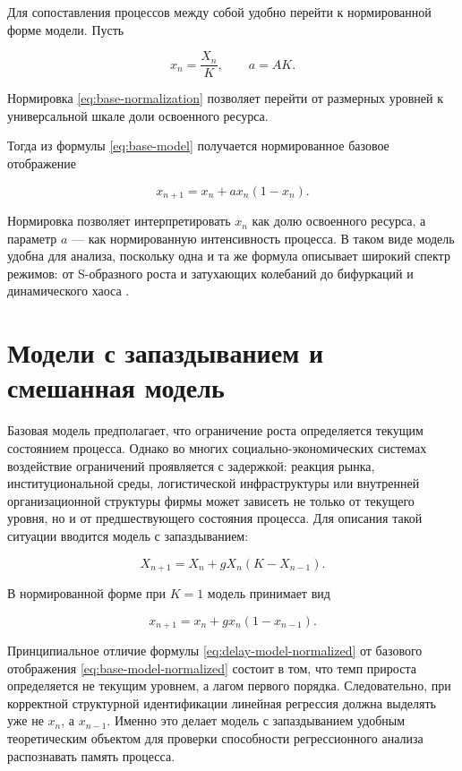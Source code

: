 Для сопоставления процессов между собой удобно перейти к нормированной форме модели. Пусть

\begin{equation}
x_n=\frac{X_n}{K}, \qquad a=AK.
\label{eq:base-normalization}
\end{equation}

Нормировка \eqref{eq:base-normalization} позволяет перейти от размерных уровней к универсальной шкале доли освоенного ресурса.

Тогда из формулы \eqref{eq:base-model} получается нормированное базовое отображение

\begin{equation}
x_{n+1}=x_n + a x_n(1-x_n).
\label{eq:base-model-normalized}
\end{equation}

Нормировка позволяет интерпретировать \(x_n\) как долю освоенного ресурса, а параметр \(a\) --- как нормированную интенсивность процесса. В таком виде модель удобна для анализа, поскольку одна и та же формула описывает широкий спектр режимов: от S-образного роста и затухающих колебаний до бифуркаций и динамического хаоса \cite{malinetsky,strogatz,feigenbaum-ufn}.

\section{Модели с запаздыванием и смешанная модель}
\label{sec:delay-and-mixed-models}

Базовая модель предполагает, что ограничение роста определяется текущим состоянием процесса. Однако во многих социально-экономических системах воздействие ограничений проявляется с задержкой: реакция рынка, институциональной среды, логистической инфраструктуры или внутренней организационной структуры фирмы может зависеть не только от текущего уровня, но и от предшествующего состояния процесса. Для описания такой ситуации вводится модель с запаздыванием:

\begin{equation}
X_{n+1}=X_n + g X_n (K-X_{n-1}).
\label{eq:delay-model}
\end{equation}

В нормированной форме при \(K=1\) модель принимает вид

\begin{equation}
x_{n+1}=x_n + g x_n (1-x_{n-1}).
\label{eq:delay-model-normalized}
\end{equation}

Принципиальное отличие формулы \eqref{eq:delay-model-normalized} от базового отображения \eqref{eq:base-model-normalized} состоит в том, что темп прироста определяется не текущим уровнем, а лагом первого порядка. Следовательно, при корректной структурной идентификации линейная регрессия должна выделять уже не \(x_n\), а \(x_{n-1}\). Именно это делает модель с запаздыванием удобным теоретическим объектом для проверки способности регрессионного анализа распознавать память процесса.

